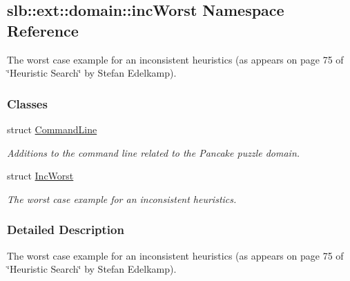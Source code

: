 \hypertarget{namespaceslb_1_1ext_1_1domain_1_1incWorst}{}\subsection{slb\+:\+:ext\+:\+:domain\+:\+:inc\+Worst Namespace Reference}
\label{namespaceslb_1_1ext_1_1domain_1_1incWorst}


The worst case example for an inconsistent heuristics (as appears on page 75 of \char`\"{}\+Heuristic Search\char`\"{} by Stefan Edelkamp).  


\subsubsection*{Classes}
\begin{DoxyCompactItemize}
\item 
struct \hyperlink{structslb_1_1ext_1_1domain_1_1incWorst_1_1CommandLine}{Command\+Line}
\begin{DoxyCompactList}\small\item\em Additions to the command line related to the Pancake puzzle domain. \end{DoxyCompactList}\item 
struct \hyperlink{structslb_1_1ext_1_1domain_1_1incWorst_1_1IncWorst}{Inc\+Worst}
\begin{DoxyCompactList}\small\item\em The worst case example for an inconsistent heuristics. \end{DoxyCompactList}\end{DoxyCompactItemize}


\subsubsection{Detailed Description}
The worst case example for an inconsistent heuristics (as appears on page 75 of \char`\"{}\+Heuristic Search\char`\"{} by Stefan Edelkamp). 